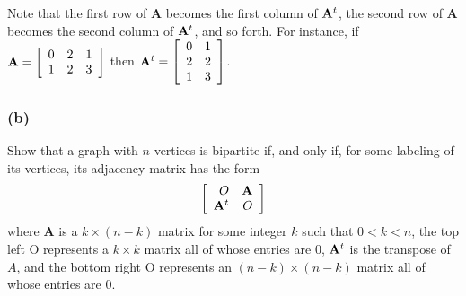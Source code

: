 \documentclass[14pt]{extarticle}
\begin{document}
Note that the first row of {\bf A} becomes the first column of \({\bf A}^t\), the second row of {\bf A} becomes the second
column of \({\bf A}^t\), and so forth. For instance, if
\({\bf A} =
\left[
    \begin{array}{rrr}
        0 & 2 & 1 \\
        1 & 2 & 3 \\
    \end{array}
    \right]
\)
then
\({\bf A}^t =
\left[
    \begin{array}{rr}
        0 & 1 \\
        2 & 2 \\
        1 & 3 \\
    \end{array}
    \right]
\).

\subsubsection{(b)}
Show that a graph with \(n\) vertices is bipartite if, and only if, for some labeling of its vertices, its adjacency
matrix has the form
\[
    \left[
        \begin{array}{rr}
            O         & {\bf A} \\
            {\bf A}^t & O       \\
        \end{array}
        \right]
\]
where {\bf A} is a \(k \times (n - k)\) matrix for some integer \(k\) such that \(0 < k < n\), the top left O
represents a \(k \times k\) matrix all of whose entries are 0, \({\bf A}^t\) is the transpose of \(A\), and the bottom right
O represents an \((n - k) \times (n - k)\) matrix all of whose entries are 0.
\end{document}
